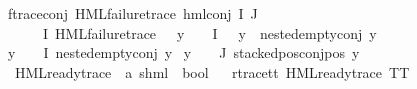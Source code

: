 \begin{isabellebody}
f{\isacharunderscore}{\kern0pt}trace{\isacharunderscore}{\kern0pt}conj{\isacharcolon}{\kern0pt}\ {\isachardoublequoteopen}HML{\isacharunderscore}{\kern0pt}failure{\isacharunderscore}{\kern0pt}trace\ {\isacharparenleft}{\kern0pt}hml{\isacharunderscore}{\kern0pt}conj\ I\ J\ {\isasymPhi}{\isacharparenright}{\kern0pt}{\isachardoublequoteclose}\isanewline
{}\ {\isachardoublequoteopen}{\isacharparenleft}{\kern0pt}{\isacharparenleft}{\kern0pt}{\isasymexists}{\isasympsi}\ {\isasymin}\ {\isacharparenleft}{\kern0pt}{\isasymPhi}\ {\isacharbackquote}{\kern0pt}\ I{\isacharparenright}{\kern0pt}{\isachardot}{\kern0pt}\ {\isacharparenleft}{\kern0pt}HML{\isacharunderscore}{\kern0pt}failure{\isacharunderscore}{\kern0pt}trace\ {\isasympsi}{\isacharparenright}{\kern0pt}\ {\isasymand}\ {\isacharparenleft}{\kern0pt}{\isasymforall}y\ {\isasymin}\ {\isacharparenleft}{\kern0pt}{\isasymPhi}\ {\isacharbackquote}{\kern0pt}\ I{\isacharparenright}{\kern0pt}{\isachardot}{\kern0pt}\ {\isasympsi}\ {\isasymnoteq}\ y\ {\isasymlongrightarrow}\ nested{\isacharunderscore}{\kern0pt}empty{\isacharunderscore}{\kern0pt}conj\ y{\isacharparenright}{\kern0pt}{\isacharparenright}{\kern0pt}\ {\isasymor}\ \isanewline
{\isacharparenleft}{\kern0pt}{\isasymforall}y\ {\isasymin}\ {\isacharparenleft}{\kern0pt}{\isasymPhi}\ {\isacharbackquote}{\kern0pt}\ I{\isacharparenright}{\kern0pt}{\isachardot}{\kern0pt}\ nested{\isacharunderscore}{\kern0pt}empty{\isacharunderscore}{\kern0pt}conj\ y{\isacharparenright}{\kern0pt}{\isacharparenright}{\kern0pt}\ {\isasymand}\isanewline
{\isacharparenleft}{\kern0pt}{\isasymforall}y\ {\isasymin}\ {\isacharparenleft}{\kern0pt}{\isasymPhi}\ {\isacharbackquote}{\kern0pt}\ J{\isacharparenright}{\kern0pt}{\isachardot}{\kern0pt}\ stacked{\isacharunderscore}{\kern0pt}pos{\isacharunderscore}{\kern0pt}conj{\isacharunderscore}{\kern0pt}pos\ y{\isacharparenright}{\kern0pt}{\isachardoublequoteclose}\isanewline
\isanewline
\isanewline
{}\isamarkupfalse%
\ HML{\isacharunderscore}{\kern0pt}ready{\isacharunderscore}{\kern0pt}trace\ {\isacharcolon}{\kern0pt}{\isacharcolon}{\kern0pt}\ {\isachardoublequoteopen}{\isacharparenleft}{\kern0pt}{\isacharprime}{\kern0pt}a{\isacharcomma}{\kern0pt}\ {\isacharprime}{\kern0pt}s{\isacharparenright}{\kern0pt}hml\ {\isasymRightarrow}\ bool{\isachardoublequoteclose}\isanewline
\ \ \isanewline
r{\isacharunderscore}{\kern0pt}trace{\isacharunderscore}{\kern0pt}tt{\isacharcolon}{\kern0pt}\ {\isachardoublequoteopen}HML{\isacharunderscore}{\kern0pt}ready{\isacharunderscore}{\kern0pt}trace\ TT{\isachardoublequoteclose}\ {\isacharbar}{\kern0pt}\isanewline

\end{isabellebody}

